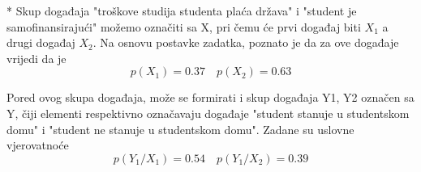 \documentclass[12pt]{article}
\begin{document}
\begin{enumerate}
* Skup događaja "troškove studija studenta plaća država" i "student je samofinansirajući" možemo
označiti sa X, pri čemu će prvi događaj biti $X_1$ a drugi događaj $X_2$. Na osnovu postavke zadatka,
poznato je da za ove događaje vrijedi da je 
\begin{equation*}
    p(X_1) = 0.37 \quad p(X_2) = 0.63
\end{equation*}
\newpage

Pored ovog skupa događaja, može se formirati i skup događaja {Y1, Y2} označen sa Y, čiji elementi
respektivno označavaju događaje "student stanuje u studentskom domu" i "student ne stanuje u
studentskom domu". Zadane su uslovne vjerovatnoće
\begin{equation*}
    p(Y_1/X_1) = 0.54 \quad p(Y_1/X_2) = 0.39
\end{equation*}
		

\end{enumerate}
\end{document}
